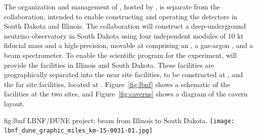 The organization and management of , hosted by , is separate from the  collaboration, intended to enable constructing and operating the  detectors in South Dakota and Illinois. %
The  collaboration will construct a deep-underground neutrino observatory in South Dakota using four independent   modules of 10 kt fiducial mass
and a high-precision, movable  at  comprising an  , a gas-argon , and a beam spectrometer. 
To enable the scientific program for the  experiment,
 will provide the facilities in Illinois and South Dakota.
These facilities are geographically separated into the near site facilities, to be constructed
at , and the far site facilities, located at . Figure~\ref{fig:lbnf} shows
a schematic of the facilities at the two sites, and Figure~\ref{fig:caverns} shows a diagram of the cavern layout. 


\begin{dunefigure}{fig:lbnf}{ 	
LBNF/DUNE project: beam from Illinois to South Dakota.}
\texttt{[image: lbnf\_dune\_graphic\_miles\_km-15-0031-01.jpg]}
\end{dunefigure}


